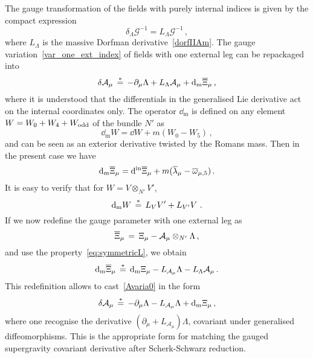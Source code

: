 \documentclass[debug]{phd}
\begin{document}
					The gauge transformation of the fields with purely internal indices is given by the compact expression
							\begin{equation}\label{gauge_var_G}
								\delta_\Lambda \mathcal{G}^{-1} = L_\Lambda \mathcal{G}^{-1}\,,
							\end{equation}
					where $L_\Lambda$ is the massive Dorfman derivative~\eqref{dorfIIAm}.
					The gauge variation~\eqref{var_one_ext_index} of fields with one external leg can be repackaged into
							\begin{equation}\label{Avaria0}
								\delta \mathcal{A}_\mu \, \stackrel{*}{=}\, -\partial_\mu \Lambda + L_\Lambda \mathcal{A}_\mu + \mathrm{d}_{\mathrm{m}} \overline{\Xi}_\mu \, ,
							\end{equation}
					where it is understood that the differentials in the generalised Lie derivative act on the internal coordinates only. The operator $\dd_{\mathrm{m}}$ is defined on any element $W = W_0 + W_4 + W_{\rm odd}$ of the bundle $N'$ as
							\begin{equation}\label{m_twist_ext_der}
								\dd_{\mathrm{m}} W = \dd W + m(W_0 - W_5)\,,
							\end{equation}
					and can be seen as an exterior derivative twisted by the Romans mass. Then in the present case we have
							\begin{equation}
								\mathrm{d}_{\mathrm{m}} \overline{\Xi}_\mu =\mathrm{d^{\text{in}}} \overline{\Xi}_\mu + m (\overline{\lambda}_\mu - \overline{\omega}_{\mu,5})\,.
							\end{equation}
					It is easy to verify that for $W = V \otimes_{N'} V' $,
							\begin{equation}\label{eq:symmetricL}
								\mathrm{d}_{\mathrm{m}} W \,\stackrel{*}{=}\, L_V V' + L_{V'}V \,\,.
							\end{equation}
					If we now redefine the gauge parameter with one external leg as
							\begin{equation}\label{redefXi}
								\overline{\Xi}_\mu\, =\, \Xi_\mu - \mathcal{A}_\mu \otimes_{N'} \Lambda\,,
							\end{equation}
					and use the property~\eqref{eq:symmetricL}, we obtain 
							\begin{equation}
								\mathrm{d}_{\mathrm{m}} \overline{\Xi}_\mu \,\stackrel{*}{=}\, \mathrm{d}_{\mathrm{m}} \Xi_\mu - L_{\mathcal{A}_\mu} \Lambda - L_\Lambda \mathcal{A}_\mu\, . 
							\end{equation}
					This redefinition allows to cast~\eqref{Avaria0} in the form
							\begin{equation} \label{Avaria}
								\delta \mathcal{A}_\mu \, \stackrel{*}{=}\, -\partial_\mu \Lambda - L_{\mathcal{A}_\mu} \Lambda + \mathrm{d}_{\mathrm{m}} \Xi_\mu \,,
							\end{equation}
					where one recognise the derivative $(\partial_\mu + L_{\mathcal A_\mu})\Lambda$, covariant under generalised diffeomorphisms. 
					This is the appropriate form for matching the gauged supergravity covariant derivative after Scherk-Schwarz reduction.
\end{document}

